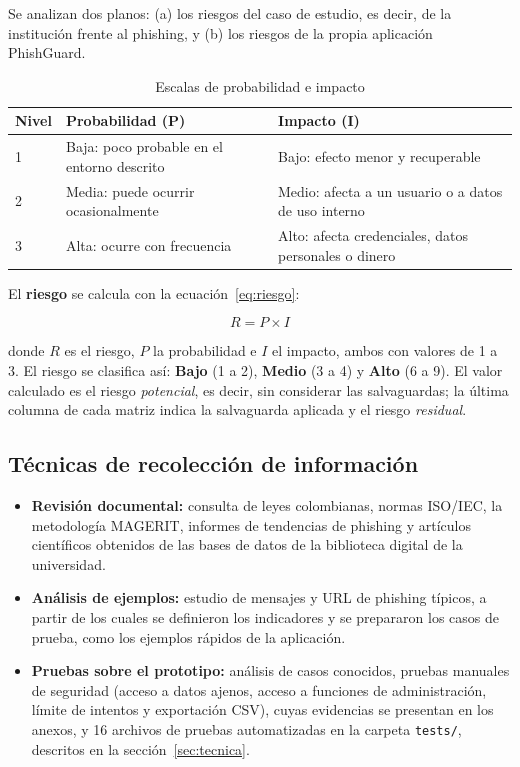 \documentclass[journal,onecolumn,12pt,draftclsnofoot]{IEEEtran}
\begin{document}
Se analizan dos planos: (a) los riesgos del caso de estudio, es decir, de la institución frente al phishing, y (b) los riesgos de la propia aplicación PhishGuard.

\begin{table}[htbp]
\centering
\caption{Escalas de probabilidad e impacto}\label{tab:escalas}
\small
\setlength{\tabcolsep}{4pt}
\begin{tabular}{|p{}|p{}|p{}|}
\hline
\textbf{Nivel} & \textbf{Probabilidad (P)} & \textbf{Impacto (I)} \\ \hline
1 & Baja: poco probable en el entorno descrito & Bajo: efecto menor y recuperable \\ \hline
2 & Media: puede ocurrir ocasionalmente & Medio: afecta a un usuario o a datos de uso interno \\ \hline
3 & Alta: ocurre con frecuencia & Alto: afecta credenciales, datos personales o dinero \\ \hline
\end{tabular}
\end{table}

El \textbf{riesgo} se calcula con la ecuación~\eqref{eq:riesgo}:

\begin{equation}\label{eq:riesgo}
R = P \times I
\end{equation}

donde $R$ es el riesgo, $P$ la probabilidad e $I$ el impacto, ambos con valores de 1 a 3. El riesgo se clasifica así: \textbf{Bajo} (1 a 2), \textbf{Medio} (3 a 4) y \textbf{Alto} (6 a 9). El valor calculado es el riesgo \emph{potencial}, es decir, sin considerar las salvaguardas; la última columna de cada matriz indica la salvaguarda aplicada y el riesgo \emph{residual}.

\subsection{Técnicas de recolección de información}

\begin{itemize}
  \item \textbf{Revisión documental:} consulta de leyes colombianas, normas ISO/IEC, la metodología MAGERIT, informes de tendencias de phishing y artículos científicos obtenidos de las bases de datos de la biblioteca digital de la universidad.
  \item \textbf{Análisis de ejemplos:} estudio de mensajes y URL de phishing típicos, a partir de los cuales se definieron los indicadores y se prepararon los casos de prueba, como los ejemplos rápidos de la aplicación.
  \item \textbf{Pruebas sobre el prototipo:} análisis de casos conocidos, pruebas manuales de seguridad (acceso a datos ajenos, acceso a funciones de administración, límite de intentos y exportación CSV), cuyas evidencias se presentan en los anexos, y 16 archivos de pruebas automatizadas en la carpeta \texttt{tests/}, descritos en la sección~\ref{sec:tecnica}.
\end{itemize}
\end{document}
